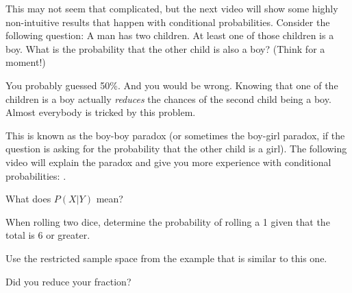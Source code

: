 \documentclass[table]{ximera}
\begin{document}
This may not seem that complicated, but the next video will show some highly non-intuitive results that happen with conditional probabilities. Consider the following question: A man has two children. At least one of those children is a boy. What is the probability that the other child is also a boy? (Think for a moment!)

You probably guessed 50\%. And you would be wrong. Knowing that one of the children is a boy actually \emph{reduces} the chances of the second child being a boy. Almost everybody is tricked by this problem.

This is known as the boy-boy paradox (or sometimes the boy-girl paradox, if the question is asking for the probability that the other child is a girl). The following video will explain the paradox and give you more experience with conditional probabilities: .

\begin{question}
What does $P(X|Y)$ mean?
  \begin{solution}
    \begin{multiple-choice}
    \end{multiple-choice}
  \end{solution}
\end{question}

\begin{question}
When rolling two dice, determine the probability of rolling a 1 given that the total is 6 or greater.
  \begin{solution}
    \begin{multiple-choice}
    \end{multiple-choice}
    \begin{hint}
      Use the restricted sample space from the example that is similar to this one.
    \end{hint}
    \begin{hint}
      Did you reduce your fraction?
    \end{hint}
  \end{solution}
\end{question}
\end{document}
